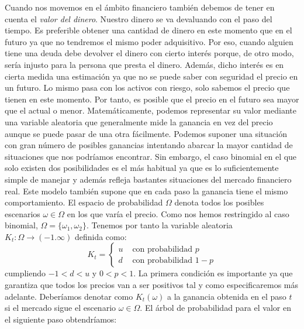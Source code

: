 Cuando nos movemos en el ámbito financiero también debemos de tener en cuenta el \textit{valor del dinero}. Nuestro dinero se va devaluando con el paso del tiempo. Es preferible obtener una cantidad de dinero en este momento que en el futuro ya que no tendremos el mismo poder adquisitivo. Por eso, cuando alguien tiene una deuda debe devolver el dinero con cierto interés porque, de otro modo, sería injusto para la persona que presta el dinero. Además, dicho interés es en cierta medida una estimación ya que no se puede saber con seguridad el precio en un futuro. Lo mismo pasa con los activos con riesgo, solo sabemos el precio que tienen en este momento. Por tanto, es posible que el precio en el futuro sea mayor que el actual o menor. Matemáticamente, podemos representar su valor mediante una variable aleatoria que generalmente mide la ganancia en vez del precio aunque se puede pasar de una otra fácilmente. Podemos suponer una situación con gran número de posibles ganancias intentando abarcar la mayor cantidad de situaciones que nos podríamos encontrar. Sin embargo, el caso binomial en el que solo existen dos posibilidades es el más habitual ya que es lo suficientemente simple de manejar y además refleja bastantes situaciones del mercado financiero real. Este modelo también supone que en cada paso la ganancia tiene el mismo comportamiento. El espacio de probabilidad $ \Omega $ denota todos los posibles escenarios $ \omega \in \Omega $ en los que varía el precio. Como nos hemos restringido al caso binomial, $ \Omega = \{ \omega_1, \omega_2\} $. Tenemos por tanto la variable aleatoria $ K_t:\Omega \longrightarrow (-1.\infty) $ definida como:
\[
K_t = \begin{cases}
 u & \text{ con probabilidad } p\\
 d & \text{ con probabilidad } 1-p
\end{cases}
\]
cumpliendo $ -1 < d < u $ y $ 0 < p <1 $. La primera condición es importante ya que garantiza que todos los precios van a ser positivos tal y como especificaremos más adelante. Deberíamos denotar como $ K_t(\omega) $ a la ganancia obtenida en el paso $ t $ si el mercado sigue el escenario $ \omega \in \Omega $. El árbol de probabilidad para el valor en el siguiente paso obtendríamos:

